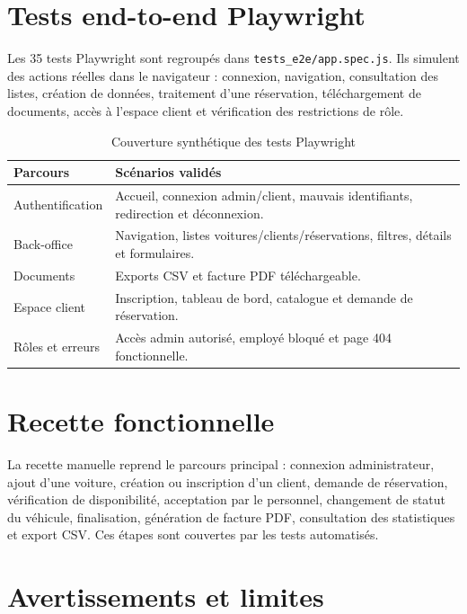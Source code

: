\section{Tests end-to-end Playwright}

Les 35 tests Playwright sont regroupés dans \texttt{tests\_e2e/app.spec.js}. Ils simulent des actions réelles dans le navigateur : connexion, navigation, consultation des listes, création de données, traitement d'une réservation, téléchargement de documents, accès à l'espace client et vérification des restrictions de rôle.

\begin{table}[H]
\centering
\caption{Couverture synthétique des tests Playwright}
\begin{tabularx}{\textwidth}{|l|X|}
\hline
\textbf{Parcours} & \textbf{Scénarios validés} \\
\hline
Authentification & Accueil, connexion admin/client, mauvais identifiants, redirection et déconnexion. \\
\hline
Back-office & Navigation, listes voitures/clients/réservations, filtres, détails et formulaires. \\
\hline
Documents & Exports CSV et facture PDF téléchargeable. \\
\hline
Espace client & Inscription, tableau de bord, catalogue et demande de réservation. \\
\hline
Rôles et erreurs & Accès admin autorisé, employé bloqué et page 404 fonctionnelle. \\
\hline
\end{tabularx}
\end{table}

\section{Recette fonctionnelle}

La recette manuelle reprend le parcours principal : connexion administrateur, ajout d'une voiture, création ou inscription d'un client, demande de réservation, vérification de disponibilité, acceptation par le personnel, changement de statut du véhicule, finalisation, génération de facture PDF, consultation des statistiques et export CSV. Ces étapes sont couvertes par les tests automatisés.

\section{Avertissements et limites}

